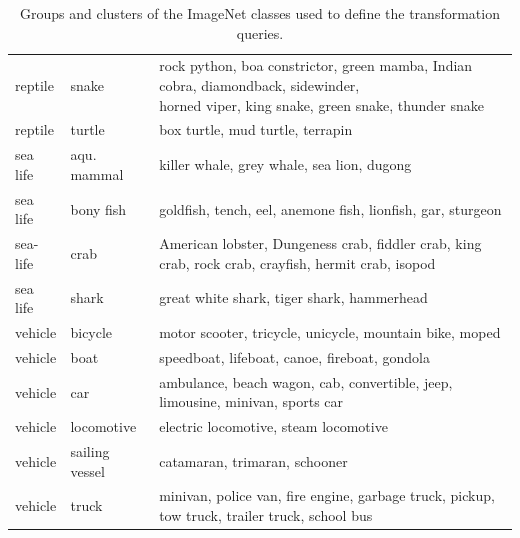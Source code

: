 \begin{table}
\begin{tabular}{lll}
reptile & snake & \makecell[l]{rock python, boa constrictor, green mamba, Indian cobra, diamondback, sidewinder, \\horned viper, king snake, green snake, thunder snake} \\
reptile & turtle & box turtle, mud turtle, terrapin \\
\midrule
sea life & aqu. mammal & killer whale, grey whale, sea lion, dugong \\
sea life & bony fish & goldfish, tench, eel, anemone fish, lionfish, gar, sturgeon \\
sea-life & crab & American lobster, Dungeness crab, fiddler crab, king crab, rock crab, crayfish, hermit crab, isopod \\
sea life & shark & great white shark, tiger shark, hammerhead \\
\midrule
vehicle & bicycle & motor scooter, tricycle, unicycle, mountain bike, moped \\
vehicle & boat & speedboat, lifeboat, canoe, fireboat, gondola \\
vehicle & car & ambulance, beach wagon, cab, convertible, jeep, limousine, minivan, sports car \\
vehicle & locomotive & electric locomotive, steam locomotive \\
vehicle & sailing vessel & catamaran, trimaran, schooner \\
vehicle & truck & minivan, police van, fire engine, garbage truck, pickup, tow truck, trailer truck, school bus \\
\bottomrule
\end{tabular}

\caption{Groups and clusters of the ImageNet classes used to define the transformation queries.
}
\label{fig:clusters} 
\end{table}



